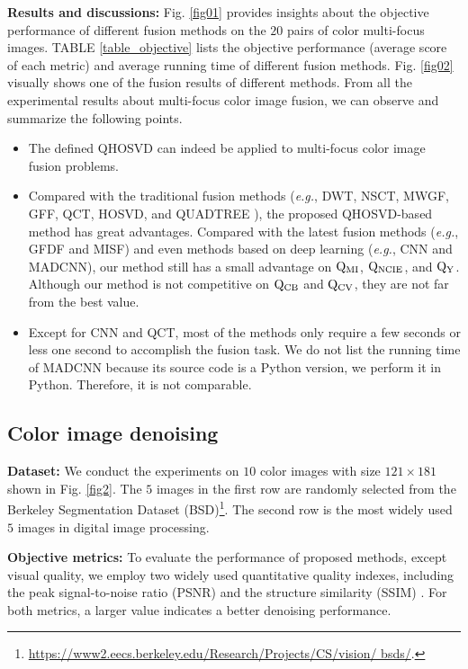 \documentclass[journal]{IEEEtran}
\begin{document}
\textbf{Results and discussions:} Fig. \ref{fig01} provides insights about the objective performance of different fusion methods on the $20$ pairs of color multi-focus images. TABLE \ref{table_objective} lists the objective performance (average score of each metric) and average running time of different fusion methods. Fig. \ref{fig02} visually shows one of the fusion results of different methods. From all the experimental results about multi-focus color image fusion, we can observe and summarize the following points.
\begin{itemize}
\item The defined QHOSVD can indeed be applied to multi-focus color image fusion problems.
\item Compared with the traditional fusion methods (\emph{e.g.}, DWT, NSCT, MWGF, GFF, QCT, HOSVD, and QUADTREE ), the proposed   QHOSVD-based method has great advantages. Compared with the latest fusion methods (\emph{e.g.}, GFDF and MISF) and even methods based on deep learning (\emph{e.g.}, CNN and MADCNN), our method still has a small advantage on $\rm{Q_{MI}}$, $\rm{Q_{NCIE}}$, and $\rm{Q_{Y}}$. Although our method is not competitive on $\rm{Q_{CB}}$ and $\rm{Q_{CV}}$, they are not far from the best value.
\item  Except for CNN and QCT, most of the methods only require a few seconds or less one second to accomplish the fusion task. We do not list the running time of MADCNN because its source code is a Python version, we perform it in Python. Therefore, it is not comparable.
\end{itemize}

\subsection{Color image denoising}
\textbf{Dataset:}  We conduct the experiments on $10$ color images with size $121\times 181$ shown in Fig. \ref{fig2}. The $5$ images in the first row are randomly selected from the Berkeley Segmentation Dataset (BSD)\footnote{\url{https://www2.eecs.berkeley.edu/Research/Projects/CS/vision/
		bsds/}.}. The second row is the most widely used $5$ images in digital image processing.

\textbf{Objective metrics:} To evaluate the performance of proposed methods, except visual quality, we employ two widely used quantitative quality indexes, including the peak signal-to-noise ratio (PSNR) and the structure similarity (SSIM) \cite{DBLP:journals/tip/WangBSS04}. For both metrics, a larger value indicates a better denoising performance.
\end{document}

